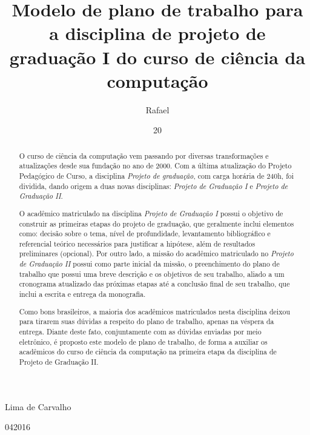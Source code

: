 \documentclass[tcc1,project]{uftex}
\begin{document}
  \title{Modelo de plano de trabalho para a disciplina de projeto de graduação I do curso de ciência da computação}
  \author{Rafael}{Lima de Carvalho}

  \date{20}{04}{2016}

  

  \maketitle

  \begin{abstract}
O curso de ciência da computação vem passando por diversas transformações e atualizações desde sua fundação no ano de 2000. Com a última atualização do Projeto Pedagógico de Curso, a disciplina \textit{Projeto de graduação}, com carga horária de 240h, foi dividida, dando origem a duas novas disciplinas: \textit{Projeto de Graduação I} e \textit{Projeto de Graduação II}. 

O acadêmico matriculado na disciplina \textit{Projeto de Graduação I} possui o objetivo de construir as primeiras etapas do projeto de graduação, que geralmente inclui elementos como: decisão sobre o tema, nível de profundidade, levantamento bibliográfico e referencial teórico necessários para justificar a hipótese, além de resultados preliminares (opcional). Por outro lado, a missão do acadêmico matriculado no \textit{Projeto de Graduação II} possui como parte inicial da missão, o preenchimento do plano de trabalho que possui uma breve descrição e os objetivos de  seu trabalho, aliado a um cronograma atualizado das próximas etapas até a conclusão final de seu trabalho, que inclui a escrita e entrega da monografia.

Como bons brasileiros, a maioria dos acadêmicos matriculados nesta disciplina deixou para tirarem suas dúvidas a respeito do plano de trabalho, apenas na véspera da entrega. Diante deste fato, conjuntamente com as dúvidas enviadas por meio eletrônico, é proposto este modelo de plano de trabalho, de forma a auxiliar os acadêmicos do curso de ciência da computação na primeira etapa da disciplina de Projeto de Graduação II.

 \end{abstract}
\end{document}
